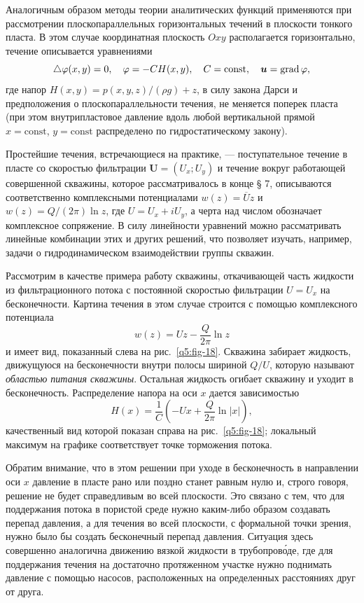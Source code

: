 Аналогичным образом методы теории аналитических функций применяются при рассмотрении плоскопараллельных горизонтальных течений в плоскости тонкого пласта. В этом случае координатная плоскость $Oxy$ располагается горизонтально, течение описывается уравнениями
\[
\triangle\varphi(x,y)=0,\quad\varphi=-CH(x,y),\quad C=\mathrm{const},\quad\boldsymbol{u}=\operatorname{grad}\varphi,
\]
где напор $H(x,y)=p(x,y,z)/(\rho g)+z$, в силу закона Дарси и предположения о плоскопараллельности течения, не меняется поперек пласта (при этом внутрипластовое давление вдоль любой вертикальной прямой $x=\mathrm{const}$, $y=\mathrm{const}$ распределено по гидростатическому закону).

Простейшие течения, встречающиеся на практике, --- поступательное течение в пласте со скоростью фильтрации $\boldsymbol{U}=(U_x;U_y)$ и течение вокруг работающей совершенной скважины, которое рассматривалось в конце § 7, описываются соответственно комплексными потенциалами $w(z)=\overline{U}z$ и $w(z)=Q/(2\pi)\ln z$, где $U=U_x+iU_y$, а черта над числом обозначает комплексное сопряжение. В силу линейности уравнений можно рассматривать линейные комбинации этих и других решений, что позволяет изучать, например, задачи о гидродинамическом взаимодействии группы скважин.

Рассмотрим в качестве примера работу скважины, откачивающей часть жидкости из фильтрационного потока с постоянной скоростью фильтрации $U=U_x$ на бесконечности. Картина течения в этом случае строится с помощью комплексного потенциала
\[
w(z)=Uz-\frac{Q}{2\pi}\ln z
\]
и имеет вид, показанный слева на рис.~\ref{q5:fig-18}. Скважина забирает жидкость, движущуюся на бесконечности внутри полосы шириной $Q/U$, которую называют \textit{областью питания скважины}. Остальная жидкость огибает скважину и уходит в бесконечность. Распределение напора на оси $x$ дается зависимостью
\[
H(x)=\frac{1}{C}\left(-Ux+\frac{Q}{2\pi}\ln|x|\right),
\]
качественный вид которой показан справа на рис.~\ref{q5:fig-18}; локальный максимум на графике соответствует точке торможения потока.

Обратим внимание, что в этом решении при уходе в бесконечность в направлении оси $x$ давление в пласте рано или поздно станет равным нулю и, строго говоря, решение не будет справедливым во всей плоскости. Это связано с тем, что для поддержания потока в пористой среде нужно каким-либо образом создавать перепад давления, а для течения во всей плоскости, с формальной точки зрения, нужно было бы создать бесконечный перепад давления. Ситуация здесь совершенно аналогична движению вязкой жидкости в трубопров\'оде, где для поддержания течения на достаточно протяженном участке нужно поднимать давление с помощью насосов, расположенных на определенных расстояниях друг от друга.

